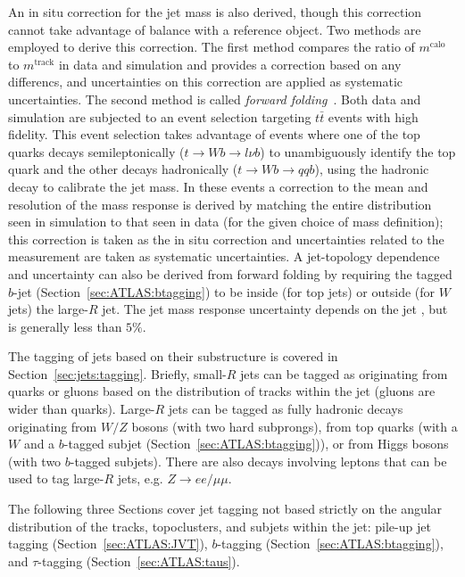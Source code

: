An in situ correction for the jet mass is also derived, though this correction cannot take advantage of \pt{} balance with a reference object.
Two methods are employed to derive this correction.
The first method compares the ratio of $m^\text{calo}$ to $m^\text{track}$ in data and simulation and provides a correction based on any differencs, and uncertainties on this correction are applied as systematic uncertainties.
The second method is called \textit{forward folding}~\cite{ATLAS-CONF-2016-008}.
Both data and simulation are subjected to an event selection targeting $t\bar{t}$ events with high fidelity.
This event selection takes advantage of events where one of the top quarks decays semileptonically ($t\rightarrow Wb \rightarrow l\nu b$) to unambiguously identify the top quark and the other decays hadronically ($t\rightarrow Wb \rightarrow qqb$), using the hadronic decay to calibrate the jet mass.
In these events a correction to the mean and resolution of the mass response is derived by matching the entire distribution seen in simulation to that seen in data (for the given choice of mass definition); this correction is taken as the in situ correction and uncertainties related to the measurement are taken as systematic uncertainties.
A jet-topology dependence and uncertainty can also be derived from forward folding by requiring the tagged $b$-jet (Section~\ref{sec:ATLAS:btagging}) to be inside (for top jets) or outside (for $W$ jets) the large-$R$ jet.
The jet mass response uncertainty depends on the jet \pt{}, but is generally less than $5\%$.

The tagging of jets based on their substructure is covered in Section~\ref{sec:jets:tagging}.
Briefly, small-$R$ jets can be tagged as originating from quarks or gluons based on the distribution of tracks within the jet (gluons are wider than quarks).
Large-$R$ jets can be tagged as fully hadronic decays originating from $W/Z$ bosons (with two hard subprongs), from top quarks (with a $W$ and a $b$-tagged subjet (Section~\ref{sec:ATLAS:btagging})), or from Higgs bosons (with two $b$-tagged subjets).
There are also decays involving leptons that can be used to tag large-$R$ jets, e.g. $Z\rightarrow ee/\mu\mu$.

The following three Sections cover jet tagging not based strictly on the angular distribution of the tracks, topoclusters, and subjets within the jet: pile-up jet tagging (Section~\ref{sec:ATLAS:JVT}), $b$-tagging (Section~\ref{sec:ATLAS:btagging}), and $\tau$-tagging (Section~\ref{sec:ATLAS:taus}).

